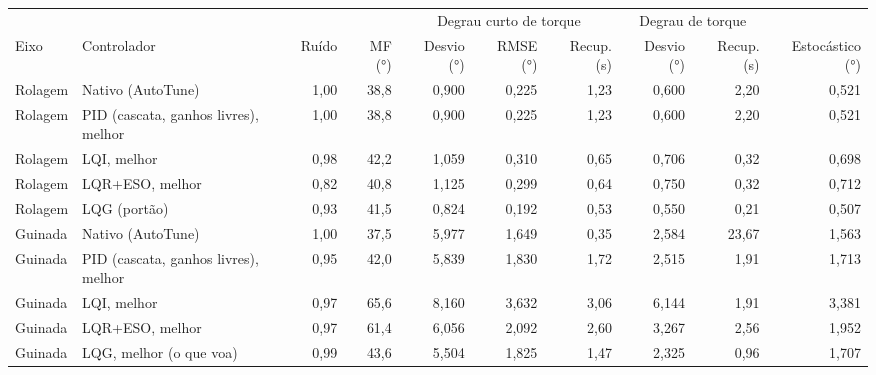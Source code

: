 \begin{tabular}{llrrrrrrrr}
\toprule
 & & & & \multicolumn{3}{c}{Degrau curto de torque} & \multicolumn{2}{c}{Degrau de torque} & \\
\cmidrule(lr){5-7}\cmidrule(lr){8-9}
Eixo & Controlador & Ruído & MF (\si{\degree}) & Desvio (\si{\degree}) & RMSE (\si{\degree}) & Recup. (\si{\second}) & Desvio (\si{\degree}) & Recup. (\si{\second}) & Estocástico (\si{\degree}) \\
\midrule
Rolagem & Nativo (AutoTune) & 1,00 & 38,8 & 0,900 & 0,225 & 1,23 & 0,600 & 2,20 & 0,521 \\
Rolagem & PID (cascata, ganhos livres), melhor & 1,00 & 38,8 & 0,900 & 0,225 & 1,23 & 0,600 & 2,20 & 0,521 \\
Rolagem & LQI, melhor & 0,98 & 42,2 & 1,059 & 0,310 & 0,65 & 0,706 & 0,32 & 0,698 \\
Rolagem & LQR+ESO, melhor & 0,82 & 40,8 & 1,125 & 0,299 & 0,64 & 0,750 & 0,32 & 0,712 \\
Rolagem & LQG (portão) & 0,93 & 41,5 & 0,824 & 0,192 & 0,53 & 0,550 & 0,21 & 0,507 \\
\addlinespace
Guinada & Nativo (AutoTune) & 1,00 & 37,5 & 5,977 & 1,649 & 0,35 & 2,584 & 23,67 & 1,563 \\
Guinada & PID (cascata, ganhos livres), melhor & 0,95 & 42,0 & 5,839 & 1,830 & 1,72 & 2,515 & 1,91 & 1,713 \\
Guinada & LQI, melhor & 0,97 & 65,6 & 8,160 & 3,632 & 3,06 & 6,144 & 1,91 & 3,381 \\
Guinada & LQR+ESO, melhor & 0,97 & 61,4 & 6,056 & 2,092 & 2,60 & 3,267 & 2,56 & 1,952 \\
Guinada & LQG, melhor (o que voa) & 0,99 & 43,6 & 5,504 & 1,825 & 1,47 & 2,325 & 0,96 & 1,707 \\
\bottomrule
\end{tabular}

